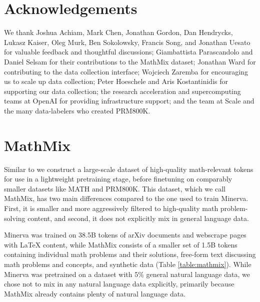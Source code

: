 \documentclass{article}
\newcommand{\changeurlcolor}[1]{\hypersetup{urlcolor=#1}}
\begin{document}
\section*{Acknowledgements}

We thank Joshua Achiam, Mark Chen, Jonathan Gordon, Dan Hendrycks, Lukasz Kaiser, Oleg Murk, Ben Sokolowsky, Francis Song, and Jonathan Uesato for valuable feedback and thoughtful discussions; Giambattista Parascandolo and Daniel Selsam for their contributions to the MathMix dataset; Jonathan Ward for contributing to the data collection interface; Wojciech Zaremba for encouraging us to scale up data collection; Peter Hoeschele and Aris Kostantinidis for supporting our data collection; the research acceleration and supercomputing teams at OpenAI for providing infrastructure support; and the team at Scale and the many data-labelers who created PRM800K.

\changeurlcolor{black}



\changeurlcolor{blue}

\appendix

\clearpage

\section{MathMix} \label{appendix:mathmix}

Similar to \cite{lewkowycz2022solving} we construct a large-scale dataset of high-quality math-relevant tokens for use in a lightweight pretraining stage, before finetuning on comparably smaller datasets like MATH and PRM800K. This dataset, which we call MathMix, has two main differences compared to the one used to train Minerva. First, it is smaller and more aggressively filtered to high-quality math problem-solving content, and second, it does not explicitly mix in general language data.

Minerva was trained on 38.5B tokens of arXiv documents and webscrape pages with LaTeX content, while MathMix consists of a smaller set of 1.5B tokens containing individual math problems and their solutions, free-form text discussing math problems and concepts, and synthetic data (Table \ref{table:mathmix}). While Minerva was pretrained on a dataset with 5\% general natural language data, we chose not to mix in any natural language data explicitly, primarily because MathMix already contains plenty of natural language data.
\end{document}

